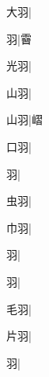 \begin{multicols}{2}
{{大羽}\mktsJzrVerticalBar{}{\cjk{}{\cnsym{}　}{\cnsym{}　}{\cnsym{}　}}|{}\par
{羽}\mktsJzrVerticalBar{}{\cjk{}{\cnsym{}　}{\cnsym{}　}{\cnsym{}　}}|{\cjk{}霫}\par
{\cjk{}{\cnsym{}　}光羽}\mktsJzrVerticalBar{}{\cjk{}{\cnsym{}　}{\cnsym{}　}{\cnsym{}　}}|{}\par
{\cjk{}{\cnsym{}　}山羽}\mktsJzrVerticalBar{}{\cjk{}{\cnsym{}　}{\cnsym{}　}{\cnsym{}　}}|{}\par
{\cjk{}{\cnsym{}　}山羽}\mktsJzrVerticalBar{}{\cjk{}{\cnsym{}　}{\cnsym{}　}{\cnsym{}　}}|{\cjk{}嶍}\par
{\cjk{}{\cnsym{}　}口羽}\mktsJzrVerticalBar{}{\cjk{}{\cnsym{}　}{\cnsym{}　}{\cnsym{}　}}|{}\par
{羽}\mktsJzrVerticalBar{}{\cjk{}{\cnsym{}　}{\cnsym{}　}{\cnsym{}　}}|{}\par
{\cjk{}{\cnsym{}　}虫羽}\mktsJzrVerticalBar{}{\cjk{}{\cnsym{}　}{\cnsym{}　}{\cnsym{}　}}|{}\par
{\cjk{}{\cnsym{}　}巾羽}\mktsJzrVerticalBar{}{\cjk{}{\cnsym{}　}{\cnsym{}　}{\cnsym{}　}}|{}\par
{羽}\mktsJzrVerticalBar{}{\cjk{}{\cnsym{}　}{\cnsym{}　}{\cnsym{}　}}|{}\par
{羽}\mktsJzrVerticalBar{}{\cjk{}{\cnsym{}　}{\cnsym{}　}{\cnsym{}　}}|{}\par
{\cjk{}{\cnsym{}　}毛羽}\mktsJzrVerticalBar{}{\cjk{}{\cnsym{}　}{\cnsym{}　}{\cnsym{}　}}|{}\par
{\cjk{}{\cnsym{}　}片羽}\mktsJzrVerticalBar{}{\cjk{}{\cnsym{}　}{\cnsym{}　}{\cnsym{}　}}|{}\par
{羽}\mktsJzrVerticalBar{}{\cjk{}{\cnsym{}　}{\cnsym{}　}{\cnsym{}　}}|{}\par
}
\end{multicols}
